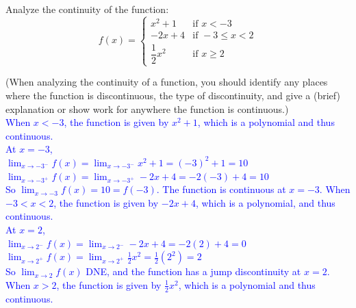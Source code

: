 \documentclass{ximera}
\begin{document}
\begin{exercise}
  Analyze the continuity of the function:\\

\[ f(x) = 
  \begin{cases} 
     x^2+1 & \text{if } x < -3 \\ 
     -2x+4 & \text{if } -3 \leq x < 2 \\
     \dfrac{1}{2}x^2 & \text{if } x \geq 2 
  \end{cases}  \]

(When analyzing the continuity of a function, you should identify any places where the function is discontinuous, the type of discontinuity, and give a (brief) explanation or show work for anywhere the function is continuous.)\\
\textcolor{blue}{When $x<-3$, the function is given by $x^2+1$, which is a polynomial and thus continuous.\\
At $x=-3$,\\
$\lim_{x\rightarrow -3^-}f(x)=\lim_{x\rightarrow -3^-}x^2+1=(-3)^2+1=10$\\
$\lim_{x\rightarrow -3^+}f(x)=\lim_{x\rightarrow -3^+} -2x+4=-2(-3)+4=10$\\
So $\lim_{x\rightarrow -3}f(x)=10=f(-3)$.  The function is continuous at $x=-3$.
When $-3< x<2$, the function is given by $-2x+4$, which is a polynomial, and thus continuous.\\
At $x=2$, \\
$\lim_{x\rightarrow 2^-}f(x)=\lim_{x\rightarrow 2^-}-2x+4=-2(2)+4=0$\\
$\lim_{x\rightarrow 2^+}f(x)=\lim_{x\rightarrow 2^+} \frac{1}{2}x^2=\frac12(2^2)=2$\\
So $\lim_{x\rightarrow 2}f(x)$ DNE, and the function has a jump discontinuity at $x=2$.  
When $x>2$, the function is given by $\frac12 x^2$, which is a polynomial and thus continuous.}

\end{exercise}
\end{document}
